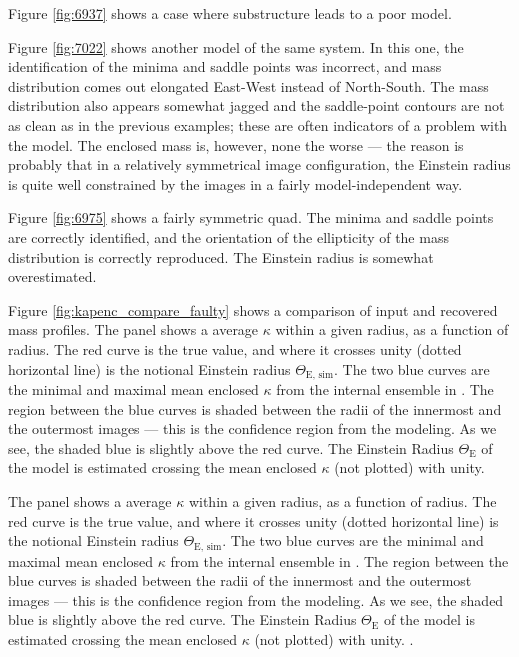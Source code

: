 Figure \ref{fig:6937} shows a case where substructure leads to a
poor model.


Figure \ref{fig:7022} shows another model of the same system.  In this
one, the identification of the minima and saddle points was incorrect,
and mass distribution comes out elongated East-West instead of
North-South.  The mass distribution also appears somewhat jagged and
the saddle-point contours are not as clean as in the previous
examples; these are often indicators of a problem with the model.  The
enclosed mass is, however, none the worse --- the reason is probably
that in a relatively symmetrical image configuration, the Einstein
radius is quite well constrained by the images in a fairly
model-independent way.


Figure \ref{fig:6975} shows a fairly symmetric quad.  The minima and
saddle points are correctly identified, and the orientation of the
ellipticity of the mass distribution is correctly reproduced.  The
Einstein radius is somewhat overestimated.  

Figure \ref{fig:kapenc_compare_faulty} shows a comparison of input and
recovered mass profiles.  The panel shows a average $\kappa$ within a
given radius, as a function of radius.  The red curve is the true
value, and where it crosses unity (dotted horizontal line) is the
notional Einstein radius $\Theta_{\text{E, sim}}$.  The two blue
curves are the minimal and maximal mean enclosed $\kappa$ from the
internal ensemble in \spl.  The region between the blue curves is
shaded between the radii of the innermost and the outermost images ---
this is the confidence region from the modeling.  As we see, the
shaded blue is slightly above the red curve.  The Einstein Radius
$\Theta_\text{E}$ of the model is estimated crossing the mean enclosed
$\kappa$ (not plotted) with unity.


The panel shows
a average $\kappa$ within a given radius, as a function of radius.
The red curve is the true value, and where it crosses unity (dotted
horizontal line) is the notional Einstein radius $\Theta_{\text{E, sim}}$.
  The two blue curves
are the minimal and maximal mean enclosed $\kappa$ from the internal
ensemble in \spl.  The region between the blue curves is shaded
between the radii of the innermost and the outermost images --- this
is the confidence region from the modeling.  As we see, the shaded
blue is slightly above the red curve. 
The Einstein Radius $\Theta_\text{E}$ of the model is estimated crossing the
mean enclosed $\kappa$ (not plotted) with unity. \citep[see, e.g.,][]{2002LNP...608....1C}.

